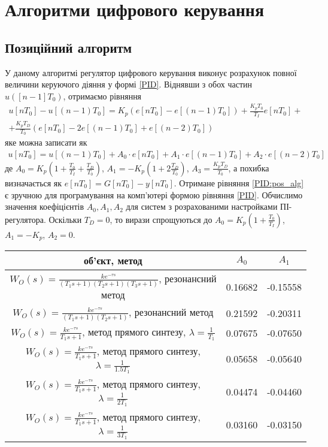 \chapter{Алгоритми цифрового керування}
\section{Позиційний алгоритм}
У даному алгоритмі регулятор цифрового керування виконує розрахунок повної величини
керуючого діяння у формі \eqref{PID}. Віднявши з обох частин $u\left([n-1] T_0\right)$,
отримаємо рівняння
\begin{gather*}
    u\left[n T_0\right] - u\left[(n-1) T_0\right] = K_p \left(
        e\left[n T_0\right] - e\left[(n-1) T_0\right]
    \right) + 
    \frac{K_p T_0}{T_I} e\left[n T_0\right] + \\ +
    \frac{K_p T_D}{T_0} \left(
        e\left[n T_0\right] - 2e\left[(n-1) T_0\right] + e\left[(n-2) T_0\right]
    \right)
\end{gather*}
яке можна записати як
\begin{gather}\label{PID:pos_alg}
    u\left[n T_0\right] = u\left[(n-1) T_0\right] + 
    A_0 \cdot e\left[n T_0\right] + A_1 \cdot e\left[(n-1) T_0\right] + A_2 \cdot e\left[(n-2) T_0\right]
\end{gather}
де $A_0 = K_p \left(1 + \frac{T_0}{T_I} + \frac{T_D}{T_0}\right)$,
$A_1 = -K_p \left(1 + 2\frac{T_D}{T_0}\right)$, $A_3 = \frac{K_p T_D}{T_0}$, а похибка визначається як
$e\left[n T_0\right] = G\left[n T_0\right] - y\left[n T_0\right]$.
Отримане рівняння \eqref{PID:pos_alg} є зручною для програмування на комп'ютері формою рівняння
\eqref{PID}.
Обчислимо значення коефіцієнтів $A_0, A_1, A_2$ для систем з розрахованими настройками ПІ-регулятора.
Оскільки $T_D = 0$, то вирази спрощуються до $A_ 0 = K_p\left(1 + \frac{T_0}{T_I}\right)$,
$A_1 = -K_p$, $A_2 = 0$.
\begin{center}
    \begin{tabular}{|c|c|c|}
        \hline
        об'єкт, метод & $A_0$ & $A_1$ \\
        \hline
        $W_O(s) = \frac{ k e^{-\tau s}}{(T_1 s + 1) (T_2 s + 1) (T_3 s + 1)}$, резонансний метод 
        & 0.16682 & -0.15558 \\ \hline
        $W_O(s) = \frac{ k e^{-\tau s}}{(T_1 s + 1) (T_2 s + 1)}$, резонансний метод 
        & 0.21592 & -0.20311 \\ \hline
        $W_O(s) = \frac{ k e^{-\tau s}}{T_1 s + 1}$, метод прямого синтезу, $\lambda = \frac{1}{T_1}$ 
        & 0.07675 & -0.07650 \\ \hline
        $W_O(s) = \frac{ k e^{-\tau s}}{T_1 s + 1}$, метод прямого синтезу, $\lambda = \frac{1}{1.5T_1}$ 
        & 0.05658 & -0.05640 \\ \hline
        $W_O(s) = \frac{ k e^{-\tau s}}{T_1 s + 1}$, метод прямого синтезу, $\lambda = \frac{1}{2T_1}$ 
        & 0.04474 & -0.04460 \\ \hline
        $W_O(s) = \frac{ k e^{-\tau s}}{T_1 s + 1}$, метод прямого синтезу, $\lambda = \frac{1}{3T_1}$ 
        & 0.03160 & -0.03150 \\ \hline
    \end{tabular}
\end{center}

